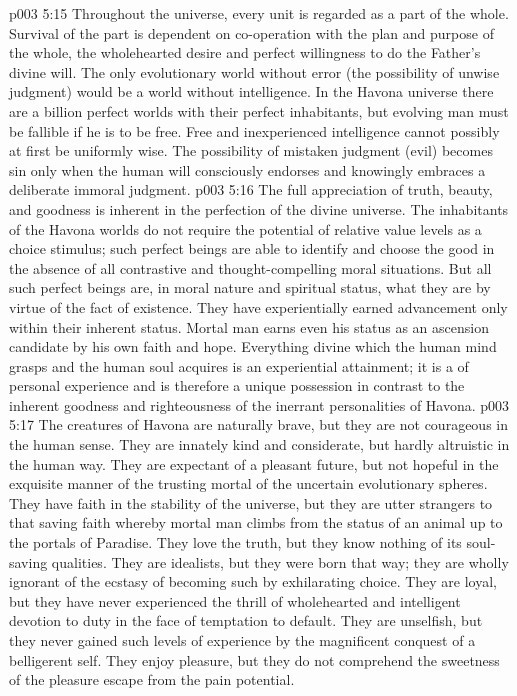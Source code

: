 \vs p003 5:15 \pc Throughout the universe, every unit is regarded as a part of the whole. Survival of the part is dependent on co\hyp{}operation with the plan and purpose of the whole, the wholehearted desire and perfect willingness to do the Father’s divine will. The only evolutionary world without error (the possibility of unwise judgment) would be a world without  intelligence. In the Havona universe there are a billion perfect worlds with their perfect inhabitants, but evolving man must be fallible if he is to be free. Free and inexperienced intelligence cannot possibly at first be uniformly wise. The possibility of mistaken judgment (evil) becomes sin only when the human will consciously endorses and knowingly embraces a deliberate immoral judgment.
\vs p003 5:16 \pc The full appreciation of truth, beauty, and goodness is inherent in the perfection of the divine universe. The inhabitants of the Havona worlds do not require the potential of relative value levels as a choice stimulus; such perfect beings are able to identify and choose the good in the absence of all contrastive and thought\hyp{}compelling moral situations. But all such perfect beings are, in moral nature and spiritual status, what they are by virtue of the fact of existence. They have experientially earned advancement only within their inherent status. Mortal man earns even his status as an ascension candidate by his own faith and hope. Everything divine which the human mind grasps and the human soul acquires is an experiential attainment; it is a  of personal experience and is therefore a unique possession in contrast to the inherent goodness and righteousness of the inerrant personalities of Havona.
\vs p003 5:17 \pc The creatures of Havona are naturally brave, but they are not courageous in the human sense. They are innately kind and considerate, but hardly altruistic in the human way. They are expectant of a pleasant future, but not hopeful in the exquisite manner of the trusting mortal of the uncertain evolutionary spheres. They have faith in the stability of the universe, but they are utter strangers to that saving faith whereby mortal man climbs from the status of an animal up to the portals of Paradise. They love the truth, but they know nothing of its soul\hyp{}saving qualities. They are idealists, but they were born that way; they are wholly ignorant of the ecstasy of becoming such by exhilarating choice. They are loyal, but they have never experienced the thrill of wholehearted and intelligent devotion to duty in the face of temptation to default. They are unselfish, but they never gained such levels of experience by the magnificent conquest of a belligerent self. They enjoy pleasure, but they do not comprehend the sweetness of the pleasure escape from the pain potential.
